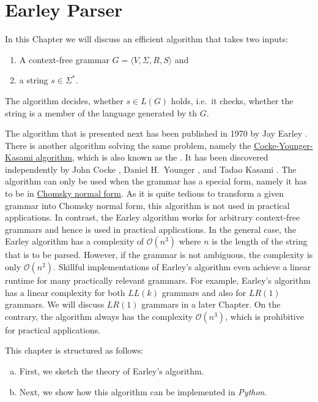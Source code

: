 \chapter{Earley Parser}
In this Chapter we will discuss an efficient algorithm that takes two inputs:
\begin{enumerate}
\item A context-free grammar $G = \langle V, \Sigma, R, S \rangle$ and
\item a string $s \in \Sigma^*$.
\end{enumerate}
The algorithm decides, whether $s \in L(G)$ holds, i.e.~it checks, whether the string is a
member of the language generated by th  $G$.

The algorithm that is presented next has been published in 1970 by Jay Earley \cite{earley:70}.
There is another algorithm solving the same problem, namely the
\href{https://en.wikipedia.org/wiki/CYK_algorithm#:~:text=In%20computer%20science%2C%20the%20Cocke,Tadao%20Kasami%2C%20and%20Jacob%20T.}{Cocke-Younger-Kasami algorithm},
  which is also known as the
.
It has been discovered independently by John Cocke
\cite{cocke:1970}, Daniel H.~Younger \cite{younger:1967}, and Tadao Kasami \cite{kasami:1965}.
The  algorithm can only be used when the grammar has a special form, namely it has to be in
\href{https://en.wikipedia.org/wiki/Chomsky_normal_form}{Chomsky normal form}.
As it is quite tedious to transform a given grammar into Chomsky normal form, this algorithm is not used in
practical applications.
In contrast, the Earley algorithm works for arbitrary context-free grammars and hence is used in practical applications.
In the general case, the Earley algorithm has a complexity of $\mathcal{O}(n^3)$ where $n$ is the length of the
string that is to be parsed.  However, if the grammar is not ambiguous, the complexity is only
$\mathcal{O}(n^2)$.  Skillful implementations of Earley's algorithm even achieve a linear runtime for many
practically relevant grammars.   
For example, Earley's algorithm has a linear complexity for both  $LL(k)$ grammars and also for $LR(1)$
grammars.  We will discuss $LR(1)$ grammars in a later Chapter.  On the contrary, the  algorithm
always has the complexity $\mathcal{O}(n^3)$, which is prohibitive for practical applications.

This chapter is structured as follows:
\begin{enumerate}[(a)]
\item First, we sketch the theory of Earley's algorithm.
\item Next, we show how this algorithm can be implemented in \textsl{Python}.
\end{enumerate}

